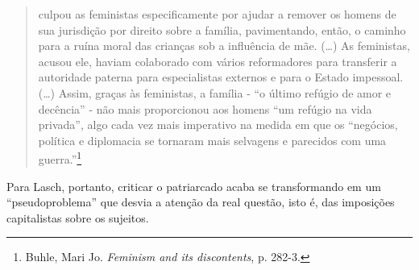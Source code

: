 \begin{quote}
culpou as feministas especificamente por ajudar a remover os homens de
sua jurisdição por direito sobre a família, pavimentando, então, o
caminho para a ruína moral das crianças sob a influência de mãe. (\ldots{})
As feministas, acusou ele, haviam colaborado com vários reformadores
para transferir a autoridade paterna para especialistas externos e para
o Estado impessoal. (\ldots{}) Assim, graças às feministas, a família -
``o último refúgio de amor e decência'' - não mais proporcionou aos
homens ``um refúgio na vida privada'', algo cada vez mais imperativo na
medida em que os ``negócios, política e diplomacia se tornaram mais
selvagens e parecidos com uma guerra.''\footnote{Buhle, Mari Jo.
  \emph{Feminism and its discontents}, p. 282-3.}
\end{quote}

Para Lasch, portanto, criticar o patriarcado acaba se transformando em
um ``pseudoproblema'' que desvia a atenção da real questão, isto é, das
imposições capitalistas sobre os sujeitos.

